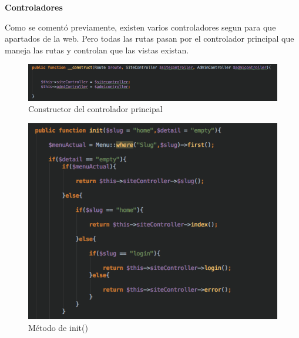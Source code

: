 \textbf{Controladores}

Como se comentó previamente, existen varios controladores segun para que apartados de la web. Pero todas las rutas pasan por el controlador principal que maneja las rutas y controlan que las vistas existan.

\begin{figure}
\begin{center}
\includegraphics[width=1.0\textwidth]{imagenes/controller-constructor.png}
\caption{Constructor del controlador principal}
\label{controller-construct}
\end{center}
\end{figure}

\begin{figure}
\begin{center}
\includegraphics[width=1.0\textwidth]{imagenes/controller-init.png}
\caption{Método de init()}
\label{controller-init}
\end{center}
\end{figure}


